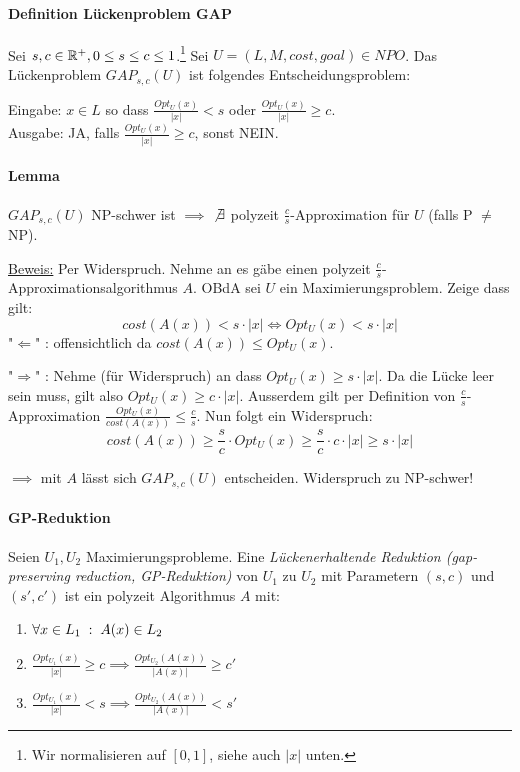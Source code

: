 \paragraph{Definition Lückenproblem GAP}
Sei $s, c\in \mathbb{R}^+, 0 \leq s \leq c \leq 1$.\footnote{Wir normalisieren auf $[0,1]$, siehe auch $|x|$ unten.}
Sei $U = (L, M, cost, goal) \in NPO$.
Das Lückenproblem $GAP_{s,c}(U)$ ist folgendes Entscheidungsproblem:

Eingabe:
$x \in L$ so dass $\frac{Opt_U(x)}{|x|} < s$ oder $\frac{Opt_U(x)}{|x|} \geq c$.
\\
Ausgabe:
JA, falls $\frac{Opt_U(x)}{|x|} \geq c$, sonst NEIN.

\paragraph{Lemma}
$GAP_{s,c}(U)$ NP-schwer ist $\implies$ $\not \exists$ polyzeit $\frac{c}{s}$-Approximation
für $U$ (falls P $\neq$ NP).

\underline{Beweis:}
Per Widerspruch. Nehme an es gäbe einen polyzeit $\frac{c}{s}$-Approximationsalgorithmus $A$.
OBdA sei $U$ ein Maximierungsproblem.
Zeige dass gilt:
$$ cost(A(x)) < s \cdot |x| \iff Opt_U(x) < s \cdot |x| $$
%
"$\Leftarrow$" : offensichtlich da $cost(A(x)) \leq Opt_U(x)$.

"$\Rightarrow$" : Nehme (für Widerspruch) an dass $Opt_U(x) \geq s \cdot |x|$.
Da die Lücke leer sein muss, gilt also $Opt_U(x) \geq c \cdot |x|$.
Ausserdem gilt per Definition von $\frac{c}{s}$-Approximation
$\frac{Opt_U(x)}{cost(A(x))} \leq \frac{c}{s}$.
Nun folgt ein Widerspruch:
$$ cost(A(x)) \geq \frac{s}{c} \cdot Opt_U(x) \geq \frac{s}{c} \cdot c \cdot |x| \geq s \cdot |x| $$

$\implies$ mit $A$ lässt sich $GAP_{s,c}(U)$ entscheiden. Widerspruch zu NP-schwer!

\paragraph{GP-Reduktion}
Seien $U_1, U_2$ Maximierungsprobleme.
Eine \emph{Lückenerhaltende Reduktion (gap-preserving reduction, GP-Reduktion)}
von $U_1$ zu $U_2$ mit Parametern $(s,c)$ und $(s',c')$ ist ein polyzeit Algorithmus $A$ mit:
\begin{enumerate}[label=(\roman*)]
    \item $ \forall x\in L_1 \; : \; A(x) \in L_2 $
    \item $ \frac{Opt_{U_1}(x)}{|x|} \geq c \implies \frac{Opt_{U_2}(A(x))}{|A(x)|} \geq c' $
    \item $ \frac{Opt_{U_1}(x)}{|x|} < s \implies \frac{Opt_{U_2}(A(x))}{|A(x)|} < s' $
\end{enumerate}

